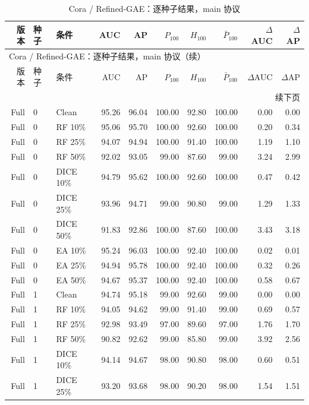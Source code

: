 {\footnotesize
\setlength{\tabcolsep}{3.2pt}
\renewcommand{\arraystretch}{1.10}
\begin{longtable}{rllrrrrrrr}
\caption{Cora / Refined-GAE：逐种子结果，main 协议}\\
\toprule
版本 & 种子 & 条件 & AUC & AP & $P_{100}$ & $H_{100}$ & $\bar P_{100}$ & $\Delta$AUC & $\Delta$AP \\
\midrule
\endfirsthead
\multicolumn{10}{l}{Cora / Refined-GAE：逐种子结果，main 协议（续）}\\
\toprule
版本 & 种子 & 条件 & AUC & AP & $P_{100}$ & $H_{100}$ & $\bar P_{100}$ & $\Delta$AUC & $\Delta$AP \\
\midrule
\endhead
\midrule\multicolumn{10}{r}{续下页}\\
\endfoot
\bottomrule
\endlastfoot
Full & 0 & Clean & 95.26 & 96.04 & 100.00 & 92.80 & 100.00 & 0.00 & 0.00 \\
Full & 0 & RF 10\% & 95.06 & 95.70 & 100.00 & 92.60 & 100.00 & 0.20 & 0.34 \\
Full & 0 & RF 25\% & 94.07 & 94.94 & 100.00 & 91.40 & 100.00 & 1.19 & 1.10 \\
Full & 0 & RF 50\% & 92.02 & 93.05 & 99.00 & 87.60 & 99.00 & 3.24 & 2.99 \\
Full & 0 & DICE 10\% & 94.79 & 95.62 & 100.00 & 92.60 & 100.00 & 0.47 & 0.42 \\
Full & 0 & DICE 25\% & 93.96 & 94.71 & 99.00 & 90.80 & 99.00 & 1.29 & 1.33 \\
Full & 0 & DICE 50\% & 91.83 & 92.86 & 100.00 & 87.60 & 100.00 & 3.43 & 3.18 \\
Full & 0 & EA 10\% & 95.24 & 96.03 & 100.00 & 92.40 & 100.00 & 0.02 & 0.01 \\
Full & 0 & EA 25\% & 94.94 & 95.78 & 100.00 & 92.40 & 100.00 & 0.32 & 0.26 \\
Full & 0 & EA 50\% & 94.67 & 95.37 & 100.00 & 92.40 & 100.00 & 0.58 & 0.67 \\
Full & 1 & Clean & 94.74 & 95.18 & 99.00 & 92.60 & 99.00 & 0.00 & 0.00 \\
Full & 1 & RF 10\% & 94.05 & 94.62 & 99.00 & 91.40 & 99.00 & 0.69 & 0.57 \\
Full & 1 & RF 25\% & 92.98 & 93.49 & 97.00 & 89.60 & 97.00 & 1.76 & 1.70 \\
Full & 1 & RF 50\% & 90.82 & 92.62 & 99.00 & 85.80 & 99.00 & 3.92 & 2.56 \\
Full & 1 & DICE 10\% & 94.14 & 94.67 & 98.00 & 90.80 & 98.00 & 0.60 & 0.51 \\
Full & 1 & DICE 25\% & 93.20 & 93.68 & 98.00 & 90.20 & 98.00 & 1.54 & 1.51 \\

\end{longtable}}
